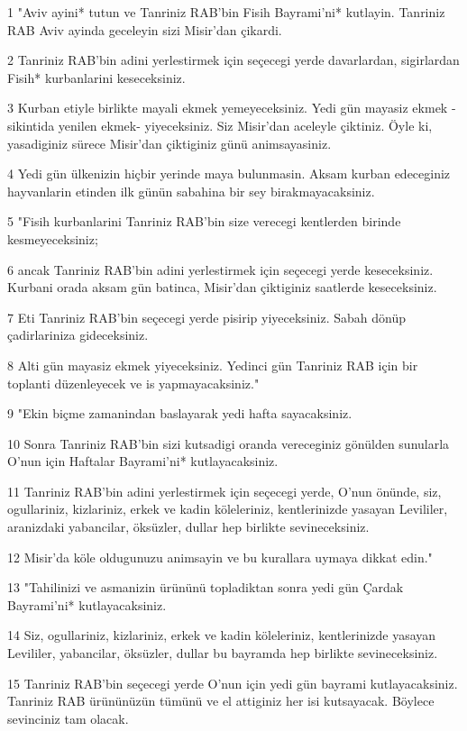 \par 1 "Aviv ayini* tutun ve Tanriniz RAB'bin Fisih Bayrami'ni* kutlayin. Tanriniz RAB Aviv ayinda geceleyin sizi Misir'dan çikardi.
\par 2 Tanriniz RAB'bin adini yerlestirmek için seçecegi yerde davarlardan, sigirlardan Fisih* kurbanlarini keseceksiniz.
\par 3 Kurban etiyle birlikte mayali ekmek yemeyeceksiniz. Yedi gün mayasiz ekmek -sikintida yenilen ekmek- yiyeceksiniz. Siz Misir'dan aceleyle çiktiniz. Öyle ki, yasadiginiz sürece Misir'dan çiktiginiz günü animsayasiniz.
\par 4 Yedi gün ülkenizin hiçbir yerinde maya bulunmasin. Aksam kurban edeceginiz hayvanlarin etinden ilk günün sabahina bir sey birakmayacaksiniz.
\par 5 "Fisih kurbanlarini Tanriniz RAB'bin size verecegi kentlerden birinde kesmeyeceksiniz;
\par 6 ancak Tanriniz RAB'bin adini yerlestirmek için seçecegi yerde keseceksiniz. Kurbani orada aksam gün batinca, Misir'dan çiktiginiz saatlerde keseceksiniz.
\par 7 Eti Tanriniz RAB'bin seçecegi yerde pisirip yiyeceksiniz. Sabah dönüp çadirlariniza gideceksiniz.
\par 8 Alti gün mayasiz ekmek yiyeceksiniz. Yedinci gün Tanriniz RAB için bir toplanti düzenleyecek ve is yapmayacaksiniz."
\par 9 "Ekin biçme zamanindan baslayarak yedi hafta sayacaksiniz.
\par 10 Sonra Tanriniz RAB'bin sizi kutsadigi oranda vereceginiz gönülden sunularla O'nun için Haftalar Bayrami'ni* kutlayacaksiniz.
\par 11 Tanriniz RAB'bin adini yerlestirmek için seçecegi yerde, O'nun önünde, siz, ogullariniz, kizlariniz, erkek ve kadin köleleriniz, kentlerinizde yasayan Levililer, aranizdaki yabancilar, öksüzler, dullar hep birlikte sevineceksiniz.
\par 12 Misir'da köle oldugunuzu animsayin ve bu kurallara uymaya dikkat edin."
\par 13 "Tahilinizi ve asmanizin ürününü topladiktan sonra yedi gün Çardak Bayrami'ni* kutlayacaksiniz.
\par 14 Siz, ogullariniz, kizlariniz, erkek ve kadin köleleriniz, kentlerinizde yasayan Levililer, yabancilar, öksüzler, dullar bu bayramda hep birlikte sevineceksiniz.
\par 15 Tanriniz RAB'bin seçecegi yerde O'nun için yedi gün bayrami kutlayacaksiniz. Tanriniz RAB ürününüzün tümünü ve el attiginiz her isi kutsayacak. Böylece sevinciniz tam olacak.
